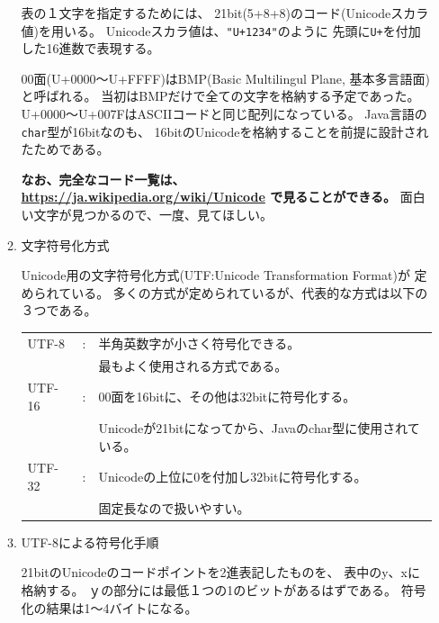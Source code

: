 \documentclass[uplatex,a4j,dvipdfmx]{ujarticle}
\begin{document}
\begin{enumerate}
\begin{enumerate}
表の１文字を指定するためには、
21bit(5+8+8)のコード(Unicodeスカラ値)を用いる。
Unicodeスカラ値は、\verb/"U+1234"/のように
先頭に\verb/U+/を付加した16進数で表現する。

00面(U+0000〜U+FFFF)はBMP(Basic Multilingul Plane, 基本多言語面)と呼ばれる。
当初はBMPだけで全ての文字を格納する予定であった。
U+0000〜U+007FはASCIIコードと同じ配列になっている。
Java言語の\verb/char/型が16bitなのも、
16bitのUnicodeを格納することを前提に設計されたためである。

{\bf なお、完全なコード一覧は、
\url{https://ja.wikipedia.org/wiki/Unicode}
で見ることができる。}
面白い文字が見つかるので、一度、見てほしい。

\item 文字符号化方式

Unicode用の文字符号化方式(UTF:Unicode Transformation Format)が
定められている。
多くの方式が定められているが、代表的な方式は以下の３つである。

\begin{tabular}{l c l }
UTF-8  & : & 半角英数字が小さく符号化できる。\\
       &   & 最もよく使用される方式である。\\
UTF-16 & : & 00面を16bitに、その他は32bitに符号化する。\\
       &   & Unicodeが21bitになってから、Javaのchar型に使用されている。\\
UTF-32 & : & Unicodeの上位に0を付加し32bitに符号化する。\\
       &   & 固定長なので扱いやすい。\\
\end{tabular}

\item UTF-8による符号化手順

21bitのUnicodeのコードポイントを2進表記したものを、
表中のy、xに格納する。
ｙの部分には最低１つの1のビットがあるはずである。
符号化の結果は1〜4バイトになる。


\end{enumerate}
\end{enumerate}
\end{document}
